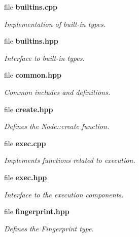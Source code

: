 \begin{CompactItemize}
\item 
file {\bf builtins.cpp}
\begin{CompactList}\small\item\em Implementation of built-in types. \item\end{CompactList}

\item 
file {\bf builtins.hpp}
\begin{CompactList}\small\item\em Interface to built-in types. \item\end{CompactList}

\item 
file {\bf common.hpp}
\begin{CompactList}\small\item\em Common includes and definitions. \item\end{CompactList}

\item 
file {\bf create.hpp}
\begin{CompactList}\small\item\em Defines the Node::create function. \item\end{CompactList}

\item 
file {\bf exec.cpp}
\begin{CompactList}\small\item\em Implements functions related to execution. \item\end{CompactList}

\item 
file {\bf exec.hpp}
\begin{CompactList}\small\item\em Interface to the execution components. \item\end{CompactList}

\item 
file {\bf fingerprint.hpp}
\begin{CompactList}\small\item\em Defines the Fingerprint type. \item\end{CompactList}


\end{CompactItemize}
